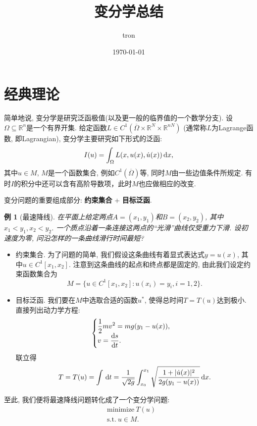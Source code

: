 \documentclass[12pt,a4paper]{article}
\title{变分学总结}
\author{tron}
\date{\today}
\newtheorem{example}[theorem]{例}
\begin{document}
\maketitle
\tableofcontents

\section{经典理论}

简单地说, 变分学是研究泛函极值(以及更一般的临界值的一个数学分支). 设$\Omega \subseteq \mathbb{R}^n$是一个有界开集.
给定函数$L \in C^1(\overline{\Omega} \times \mathbb{R}^N \times \mathbb{R}^{nN})$ (通常称$L$为Lagrange函数, 即Lagrangian), 变分学主要研究如下形式的泛函:
\begin{equation}\label{1}
    I(u) = \int_{\Omega}L(x, u(x), \dot u(x)) \,{\rm d}x,
\end{equation}
其中$u \in M$, $M$是一个函数集合, 例如$C^1(\overline{\Omega})$等, 同时$M$由一些边值条件所规定. 有时$I$的积分中还可以含有高阶导数项，此时$M$也应做相应的改变.

变分问题的重要组成部分: \textbf{约束集合} + \textbf{目标泛函}.

\begin{example}[最速降线]
    在平面上给定两点$A = (x_1, y_1)$和$B = (x_2, y_2)$, 其中$x_1 < y_1, x_2 < y_2$.
    一个质点沿着一条连接这两点的``光滑''曲线仅受重力下滑. 设初速度为零, 问沿怎样的一条曲线滑行时间最短?
\end{example}

\begin{itemize}
    \item 约束集合. 为了问题的简单, 我们假设这条曲线有着显式表达式$y = u(x)$, 其中$u \in C^1[x_1, x_2]$.
    注意到这条曲线的起点和终点都是固定的, 由此我们设定约束函数集合为
    \begin{equation*}
        M = \{u \in C^1[x_1, x_2]\colon u(x_i) = y_i, i = 1, 2\}.
    \end{equation*}
    \item 目标泛函. 我们要在$M$中选取合适的函数$u^*$, 使得总时间$T = T(u)$达到极小.
    直接列出动力学方程:
    \begin{equation*}
        \begin{cases} 
            \displaystyle{\frac{1}{2}}mv^2 = mg(y_1 - u(x)), \\  
            v = \displaystyle{\frac{{\rm d}s}{{\rm d}t}}. 
        \end{cases}
    \end{equation*}
    联立得 
    \begin{equation*}
        T = T(u) = \int \,{\rm d}t = \frac{1}{\sqrt{2g}}\int_{x_0}^{x_1}\sqrt{\frac{1 + |\dot{u}(x)|^2}{2g(y_1 - u(x))}} \,{\rm d}x.
    \end{equation*}
\end{itemize}
至此, 我们便将最速降线问题转化成了一个变分学问题: 
\begin{align*}
    &\text{minimize}\ T(u) \\ 
    &\text{s.t.}\ u \in M.
\end{align*}
\end{document}
